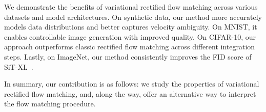 We demonstrate the benefits of variational rectified flow matching across various datasets and model architectures. On synthetic data, our method more accurately models data distributions and better captures velocity ambiguity. On MNIST, it enables controllable image generation with improved quality. On CIFAR-10, our approach outperforms classic rectified flow matching across different integration steps. Lastly, on ImageNet, our method consistently improves the FID score of SiT-XL~\cite{ma2024sit}.

In summary, our contribution is as follows: we  study the properties of variational rectified flow matching, and, along the way, offer an alternative way to interpret the flow matching procedure. %
